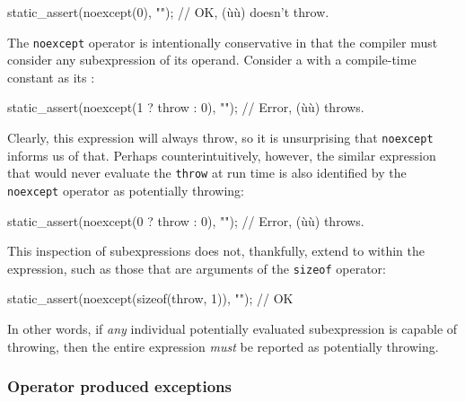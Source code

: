 \begin{emcppslisting}
static_assert(noexcept(0), "");  // OK, (ù{}ù) doesn't throw.
\end{emcppslisting}
    

\noindent The \lstinline!noexcept! operator is intentionally conservative in that the
compiler must consider any  subexpression
of its operand. Consider a  with a compile-time
constant as its :

\begin{emcppslisting}
static_assert(noexcept(1 ? throw : 0), "");  // Error, (ù{}ù) throws.
\end{emcppslisting}
    

\noindent Clearly, this expression will always throw, so it is unsurprising that
\lstinline!noexcept! informs us of that. Perhaps counterintuitively,
however, the similar expression that would never evaluate the
\lstinline!throw! at run time is also identified by the \lstinline!noexcept!
operator as potentially throwing:

\begin{emcppslisting}
static_assert(noexcept(0 ? throw : 0), "");  // Error, (ù{}ù) throws.
\end{emcppslisting}
    

\noindent This inspection of subexpressions does not, thankfully, extend to
 within the expression, such as those that
are arguments of the \lstinline!sizeof! operator:

\begin{emcppslisting}[emcppsignore={Fails on gcc}]
static_assert(noexcept(sizeof(throw, 1)), "");  // OK
\end{emcppslisting}
    

\noindent In other words, if \emph{any} individual potentially evaluated
subexpression is capable of throwing, then the entire expression
\emph{must} be reported as potentially throwing.

\subsubsection[Operator produced exceptions]{Operator produced exceptions}\label{operator-produced-exceptions}

